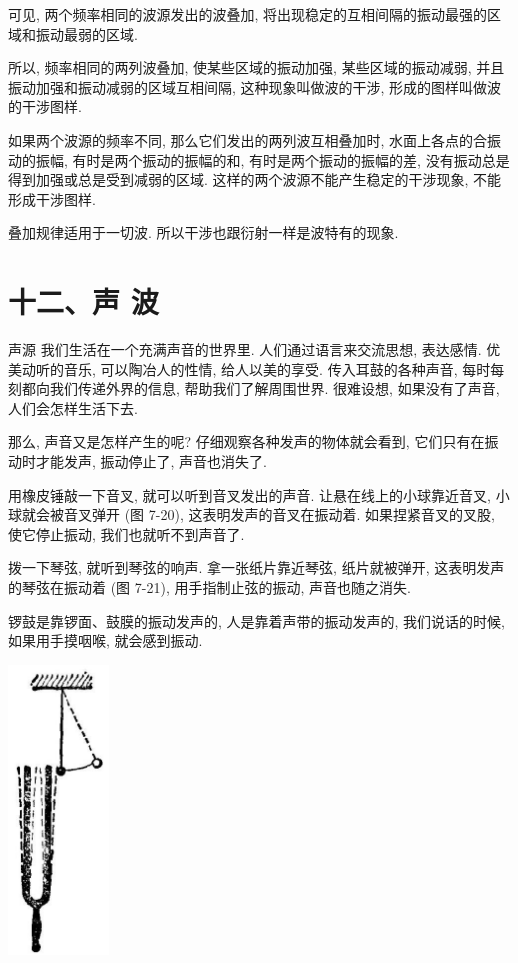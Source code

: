 \documentclass[10pt]{article}
\begin{document}
可见, 两个频率相同的波源发出的波叠加, 将出现稳定的互相间隔的振动最强的区域和振动最弱的区域.

所以, 频率相同的两列波叠加, 使某些区域的振动加强, 某些区域的振动减弱, 并且振动加强和振动减弱的区域互相间隔, 这种现象叫做波的干涉, 形成的图样叫做波的干涉图样.

如果两个波源的频率不同, 那么它们发出的两列波互相叠加时, 水面上各点的合振动的振幅, 有时是两个振动的振幅的和, 有时是两个振动的振幅的差, 没有振动总是得到加强或总是受到减弱的区域. 这样的两个波源不能产生稳定的干涉现象, 不能形成干涉图样.

叠加规律适用于一切波. 所以干涉也跟衍射一样是波特有的现象.

\section*{十二、声 波}

声源 我们生活在一个充满声音的世界里. 人们通过语言来交流思想, 表达感情. 优美动听的音乐, 可以陶冶人的性情, 给人以美的享受. 传入耳鼓的各种声音, 每时每刻都向我们传递外界的信息, 帮助我们了解周围世界. 很难设想, 如果没有了声音, 人们会怎样生活下去.

那么, 声音又是怎样产生的呢? 仔细观察各种发声的物体就会看到, 它们只有在振动时才能发声, 振动停止了, 声音也消失了.

用橡皮锤敲一下音叉, 就可以听到音叉发出的声音. 让悬在线上的小球靠近音叉, 小球就会被音叉弹开 (图 7-20), 这表明发声的音叉在振动着. 如果捏紧音叉的叉股, 使它停止振动, 我们也就听不到声音了.

拨一下琴弦, 就听到琴弦的响声. 拿一张纸片靠近琴弦, 纸片就被弹开, 这表明发声的琴弦在振动着 (图 7-21), 用手指制止弦的振动, 声音也随之消失.

锣鼓是靠锣面、鼓膜的振动发声的, 人是靠着声带的振动发声的, 我们说话的时候, 如果用手摸咽喉, 就会感到振动.

\begin{center}
\includegraphics[max width=0.2\textwidth]{images/01912d55-147c-70aa-b0e0-1782a122f948_217_936078.jpg}
\end{center}
\end{document}
